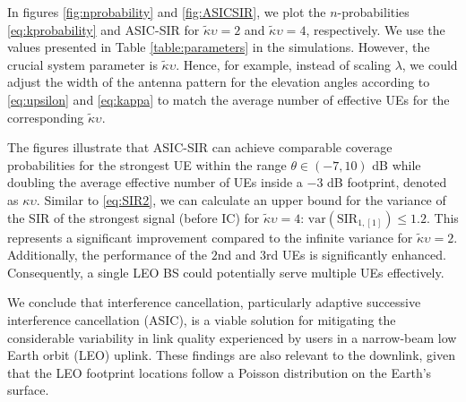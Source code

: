 \documentclass[lettersize,journal]{IEEEtran}
\begin{document}
In figures \ref{fig:nprobability} and \ref{fig:ASICSIR}, we plot the $n$-probabilities \eqref{eq:kprobability} and ASIC-SIR for $\tilde{\kappa}\upsilon=2$ and  $\tilde{\kappa}\upsilon=4$, respectively. We use the values presented in Table \ref{table:parameters} in the simulations. However, the crucial system parameter is $\tilde{\kappa}\upsilon$. Hence, for example, instead of scaling $\lambda$, we could adjust the width of the antenna pattern for the elevation angles according to \eqref{eq:upsilon} and \eqref{eq:kappa} to match the average number of effective UEs for the corresponding $\tilde{\kappa} \upsilon$.

The figures illustrate that ASIC-SIR can achieve comparable coverage probabilities for the strongest UE within the range $\theta \in (-7,10)$ dB while doubling the average effective number of UEs inside a $-3$ dB footprint, denoted as $\kappa \upsilon$. Similar to \eqref{eq:SIR2}, we can calculate an upper bound for the variance of the SIR of the strongest signal (before IC) for $\tilde{\kappa} \upsilon = 4$: $\text{var}(\text{SIR}_{1,[1]}) \leq 1.2$. This represents a significant improvement compared to the infinite variance for $\tilde{\kappa} \upsilon = 2$. Additionally, the performance of the $2$nd and $3$rd UEs is significantly enhanced. Consequently, a single LEO BS could potentially serve multiple UEs effectively.

We conclude that interference cancellation, particularly adaptive successive interference cancellation (ASIC), is a viable solution for mitigating the considerable variability in link quality experienced by users in a narrow-beam low Earth orbit (LEO) uplink. These findings are also relevant to the downlink, given that the LEO footprint locations follow a Poisson distribution on the Earth's surface.















%

\end{document}
